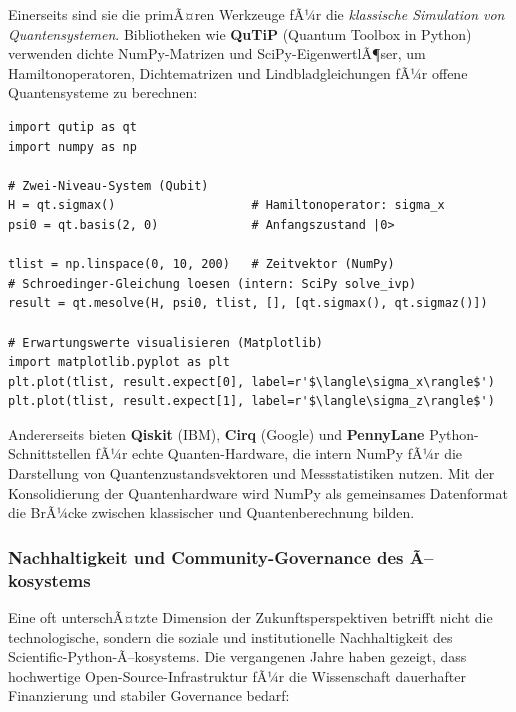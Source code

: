 \documentclass[12pt, a4paper]{article}
\begin{document}
Einerseits sind sie die primÃ¤ren Werkzeuge fÃ¼r die \emph{klassische Simulation
von Quantensystemen}. Bibliotheken wie \textbf{QuTiP} (Quantum Toolbox in
Python) verwenden dichte NumPy-Matrizen und SciPy-EigenwertlÃ¶ser, um
Hamiltonoperatoren, Dichtematrizen und Lindbladgleichungen fÃ¼r offene
Quantensysteme zu berechnen:

\begin{lstlisting}[caption={QuTiP: Quantendynamik mit NumPy/SciPy}]
import qutip as qt
import numpy as np

# Zwei-Niveau-System (Qubit)
H = qt.sigmax()                   # Hamiltonoperator: sigma_x
psi0 = qt.basis(2, 0)             # Anfangszustand |0>

tlist = np.linspace(0, 10, 200)   # Zeitvektor (NumPy)
# Schroedinger-Gleichung loesen (intern: SciPy solve_ivp)
result = qt.mesolve(H, psi0, tlist, [], [qt.sigmax(), qt.sigmaz()])

# Erwartungswerte visualisieren (Matplotlib)
import matplotlib.pyplot as plt
plt.plot(tlist, result.expect[0], label=r'$\langle\sigma_x\rangle$')
plt.plot(tlist, result.expect[1], label=r'$\langle\sigma_z\rangle$')
\end{lstlisting}

Andererseits bieten \textbf{Qiskit} (IBM), \textbf{Cirq} (Google) und
\textbf{PennyLane} Python-Schnittstellen fÃ¼r echte Quanten-Hardware, die
intern NumPy fÃ¼r die Darstellung von Quantenzustandsvektoren und
Messstatistiken nutzen. Mit der Konsolidierung der Quantenhardware wird
NumPy als gemeinsames Datenformat die BrÃ¼cke zwischen klassischer und
Quantenberechnung bilden.

\subsubsection{Nachhaltigkeit und Community-Governance des Ã–kosystems}
\label{subsubsec:governance}

Eine oft unterschÃ¤tzte Dimension der Zukunftsperspektiven betrifft nicht
die technologische, sondern die soziale und institutionelle Nachhaltigkeit
des Scientific-Python-Ã–kosystems. Die vergangenen Jahre haben gezeigt,
dass hochwertige Open-Source-Infrastruktur fÃ¼r die Wissenschaft dauerhafter
Finanzierung und stabiler Governance bedarf:
\end{document}
